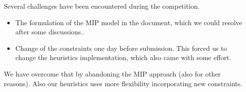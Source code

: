 \documentclass[a4paper]{article}
\begin{document}
Several challenges have been encountered during the competition. 
\begin{itemize}
    \item The formulation of the MIP model in the document, which we could resolve after some discussions..
    \item Change of the constraints one day before submission. This forced us to change the heuristics implementation, which also came with some effort.
\end{itemize}
We have overcome that by abandoning the MIP approach (also for other reasons).
Also our heuristics uses more flexibility incorporating new constraints.
\end{document}
